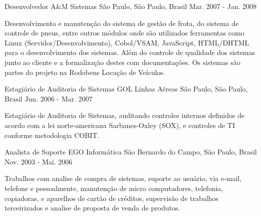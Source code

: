 \begin{cventries}
  \cventry
    {Desenvolvedor} %
    {A\&M Sistemas} %
    {São Paulo, São Paulo, Brasil} %
    {Mar. 2007 - Jan. 2008} %
    {
      \begin{cvitems} %
        \item{Desenvolvimento e manutenção do sistema de gestão de frota, do sistema de controle de pneus, entre outros módulos onde são utilizados ferramentas como Linux (Servidor/Desenvolvimento), Cobol/VSAM, JavaScript, HTML/DHTML para o desenvolvimento dos sistemas. Além do controle de qualidade dos sistemas junto ao cliente e a formalização destes com documentações. Os sistemas são partes do projeto na Rodobens Locação de Veículos.}
      \end{cvitems}
    }

  \cventry
    {Estagiário de Auditoria de Sistemas} %
    {GOL Linhas Aéreas} %
    {São Paulo, São Paulo, Brasil} %
    {Jun. 2006 - Mar. 2007} %
    {
      \begin{cvitems} %
        \item{Estagiário de Auditoria de Sistemas, auditando controles internos definidos de acordo com a lei norte-americana Sarbanes-Oxley (SOX), e controles de TI conforme metodologia COBIT.}
      \end{cvitems}
    }

  \cventry
    {Analista de Suporte} %
    {EGO Informática} %
    {São Bernardo do Campo, São Paulo, Brasil} %
    {Nov. 2003 - Mai. 2006} %
    {
      \begin{cvitems} %
        \item{Trabalhos com analise de compra de sistemas, suporte ao usuário, via e-mail, telefone e pessoalmente, manutenção de micro computadores, telefonia, copiadoras, e aparelhos de cartão de créditos, supervisão de trabalhos terceirizados e analise de proposta de venda de produtos.}
      \end{cvitems}
    }

\end{cventries}
